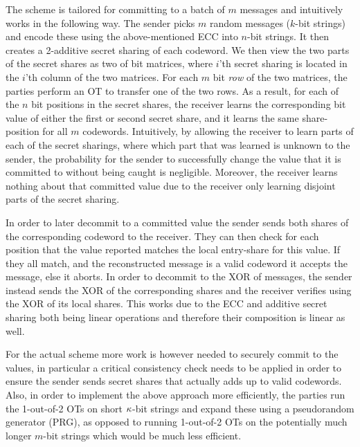 The \cite{DBLP:conf/tcc/FrederiksenJNT16} scheme is tailored for committing to a batch of $m$ messages and intuitively works in the following way. The sender picks $m$ random messages ($k$-bit strings) and encode these using the above-mentioned ECC into $n$-bit strings. It then creates a 2-additive secret sharing of each codeword. We then view the two parts of the secret shares as two of bit matrices, where $i$'th secret sharing is located in the $i$'th column of the two matrices. For each $m$ bit \emph{row} of the two matrices, the parties perform an OT to transfer one of the two rows. As a result, for each of the $n$ bit positions in the secret shares, the receiver learns the corresponding bit value of either the first or second secret share, and it learns the same share-position for all $m$ codewords. Intuitively, by allowing the receiver to learn parts of each of the secret sharings, where which part that was learned is unknown to the sender, the probability for the sender to successfully change the value that it is committed to without being caught is negligible. Moreover, the receiver learns nothing about that committed value due to the receiver only learning disjoint parts of the secret sharing.

In order to later decommit to a committed value the sender sends both shares of the corresponding codeword to the receiver. They can then check for each position that the value reported matches the local entry-share for this value. If they all match, and the reconstructed message is a valid codeword it accepts the message, else it aborts. In order to decommit to the XOR of messages, the sender instead sends the XOR of the corresponding shares and the receiver verifies using the XOR of its local shares. This works due to the ECC and additive secret sharing both being linear operations and therefore their composition is linear as well. 

For the actual scheme more work is however needed to securely commit to the values, in particular a critical consistency check needs to be applied in order to ensure the sender sends secret shares that actually adds up to valid codewords. Also, in order to implement the above approach more efficiently, the parties run the 1-out-of-2 OTs on short $\kappa$-bit strings and expand these using a pseudorandom generator (PRG), as opposed to running 1-out-of-2 OTs on the potentially much longer $m$-bit strings which would be much less efficient.